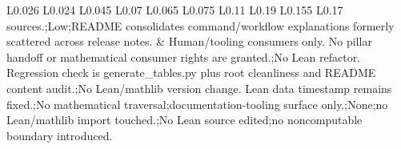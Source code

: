 \begin{longtable}{L{0.026\linewidth} L{0.024\linewidth} L{0.045\linewidth} L{0.07\linewidth} L{0.065\linewidth} L{0.075\linewidth} L{0.11\linewidth} L{0.19\linewidth} L{0.155\linewidth} L{0.17\linewidth}}
sources.;\newline Low;\newline README consolidates command/\allowbreak{}workflow explanations formerly scattered across release notes. & Human/\allowbreak{}tooling consumers only. No pillar handoff or mathematical consumer rights are granted.;\newline No Lean refactor. Regression check is generate\_tables.py plus root cleanliness and README content audit.;\newline No Lean/\allowbreak{}mathlib version change. Lean data timestamp remains fixed.;\newline No mathematical traversal;\newline documentation-tooling surface only.;\newline None;\newline no Lean/\allowbreak{}mathlib import touched.;\newline No Lean source edited;\newline no noncomputable boundary introduced.\\
\hline
\addlinespace[0.24em]

\end{longtable}
